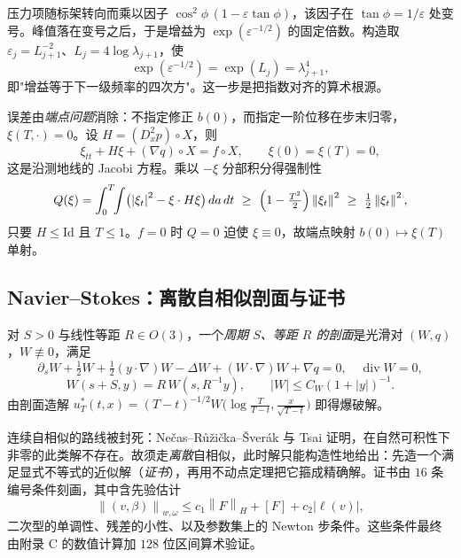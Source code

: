 \documentclass[11pt,a4paper]{ctexart}
\theoremstyle{definition}
\newcommand{\diverg}{\operatorname{div}}
\newcommand{\eps}{\varepsilon}
\newcommand{\norm}[1]{\left\lVert #1\right\rVert}
\newcommand{\abs}[1]{\left\lvert #1\right\rvert}
\begin{document}
压力项随标架转向而乘以因子 $\cos^2\phi\,(1-\eps\tan\phi)$，该因子在 $\tan\phi=1/\eps$ 处变号。峰值落在变号之后，于是增益为 $\exp(\eps^{-1/2})$ 的固定倍数。构造取 $\eps_j=L_{j+1}^{-2}$、$L_j=4\log\lambda_{j+1}$，使
\begin{equation}
\exp(\eps^{-1/2})=\exp(L_j)=\lambda_{j+1}^4 ,
\end{equation}
即"增益等于下一级频率的四次方"。这一步是把指数对齐的算术根源。

误差由\emph{端点问题}消除：不指定修正 $b(0)$，而指定一阶位移在步末归零，$\xi(T,\cdot)=0$。设 $H=(D_x^2p)\circ X$，则
\begin{equation}\label{eq:jacobi}
\xi_{tt}+H\xi+(\nabla q)\circ X=f\circ X,\qquad \xi(0)=\xi(T)=0,
\end{equation}
这是沿测地线的 Jacobi 方程。乘以 $-\xi$ 分部积分得强制性
\begin{equation}\label{eq:coerc}
Q(\xi)=\int_0^T\!\!\int\bigl(\abs{\xi_t}^2-\xi\cdot H\xi\bigr)\,da\,dt\ \ge\ \Bigl(1-\tfrac{T^2}{2}\Bigr)\norm{\xi_t}^2\ \ge\ \tfrac12\norm{\xi_t}^2 ,
\end{equation}
只要 $H\le\mathrm{Id}$ 且 $T\le1$。$f=0$ 时 $Q=0$ 迫使 $\xi\equiv0$，故端点映射 $b(0)\mapsto\xi(T)$ 单射。

\subsection{Navier--Stokes：离散自相似剖面与证书}

对 $S>0$ 与线性等距 $R\in O(3)$，一个\emph{周期 $S$、等距 $R$ 的剖面}是光滑对 $(W,q)$，$W\not\equiv0$，满足
\begin{equation}\label{eq:profile}
\partial_sW+\tfrac12W+\tfrac12(y\cdot\nabla)W-\Delta W+(W\cdot\nabla)W+\nabla q=0,\quad \diverg W=0,
\end{equation}
\[
W(s+S,y)=R\,W(s,R^{-1}y),\qquad \abs{W}\le C_W(1+\abs{y})^{-1}.
\]
由剖面造解 $u^*_T(t,x)=(T-t)^{-1/2}W\bigl(\log\frac{T}{T-t},\frac{x}{\sqrt{T-t}}\bigr)$ 即得爆破解。

连续自相似的路线被封死：Ne\v{c}as--R\r{u}\v{z}i\v{c}ka--\v{S}ver\'ak 与 Tsai 证明，在自然可积性下非零的此类解不存在。故须走\emph{离散}自相似，此时解只能构造性地给出：先造一个满足显式不等式的近似解（\emph{证书}），再用不动点定理把它箍成精确解。证书由 $16$ 条编号条件刻画，其中含先验估计
\begin{equation}\label{eq:apriori}
\norm{(v,\beta)}_{w,\omega}\le c_1\norm{F}_H+[F]+c_2\abs{\ell(v)},
\end{equation}
二次型的单调性、残差的小性、以及参数集上的 Newton 步条件。这些条件最终由附录 C 的数值计算加 $128$ 位区间算术验证。
\end{document}
